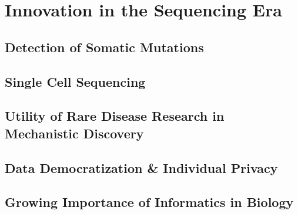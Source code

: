 \section{Innovation in the Sequencing Era}
\subsection{Detection of Somatic Mutations}
\subsection{Single Cell Sequencing}
\subsection{Utility of Rare Disease Research in Mechanistic Discovery}
\subsection{Data Democratization \& Individual Privacy}
\subsection{Growing Importance of Informatics in Biology}